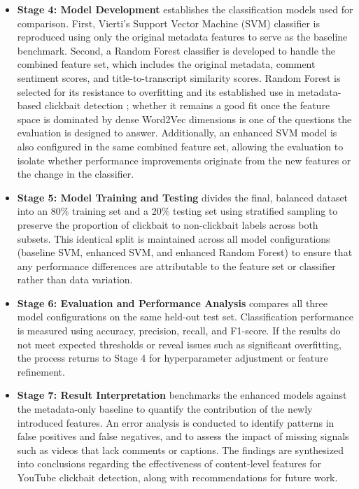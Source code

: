 \documentclass[conference]{IEEEtran}
\begin{document}
\begin{itemize}
    \item \textbf{Stage 4: Model Development} establishes the classification models used for comparison. First, Vierti's Support Vector Machine (SVM) classifier is reproduced using only the original metadata features to serve as the baseline benchmark. Second, a Random Forest classifier is developed to handle the combined feature set, which includes the original metadata, comment sentiment scores, and title-to-transcript similarity scores. Random Forest is selected for its resistance to overfitting and its established use in metadata-based clickbait detection \cite{gothankar2022}; whether it remains a good fit once the feature space is dominated by dense Word2Vec dimensions is one of the questions the evaluation is designed to answer. Additionally, an enhanced SVM model is also configured in the same combined feature set, allowing the evaluation to isolate whether performance improvements originate from the new features or the change in the classifier.
 
    \item \textbf{Stage 5: Model Training and Testing} divides the final, balanced dataset into an 80\% training set and a 20\% testing set using stratified sampling to preserve the proportion of clickbait to non-clickbait labels across both subsets. This identical split is maintained across all model configurations (baseline SVM, enhanced SVM, and enhanced Random Forest) to ensure that any performance differences are attributable to the feature set or classifier rather than data variation.
 
    \item \textbf{Stage 6: Evaluation and Performance Analysis} compares all three model configurations on the same held-out test set. Classification performance is measured using accuracy, precision, recall, and F1-score. If the results do not meet expected thresholds or reveal issues such as significant overfitting, the process returns to Stage 4 for hyperparameter adjustment or feature refinement.
 
    \item \textbf{Stage 7: Result Interpretation} benchmarks the enhanced models against the metadata-only baseline to quantify the contribution of the newly introduced features. An error analysis is conducted to identify patterns in false positives and false negatives, and to assess the impact of missing signals such as videos that lack comments or captions. The findings are synthesized into conclusions regarding the effectiveness of content-level features for YouTube clickbait detection, along with recommendations for future work.
\end{itemize}
\end{document}
